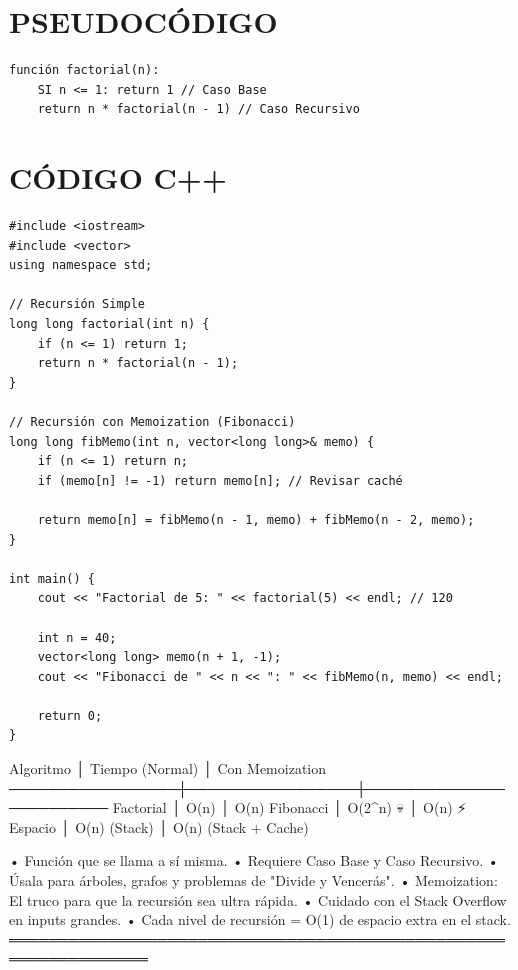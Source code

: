 \section*{PSEUDOCÓDIGO}
\hrulefill
\begin{verbatim}
función factorial(n):
    SI n <= 1: return 1 // Caso Base
    return n * factorial(n - 1) // Caso Recursivo
\end{verbatim}
\section*{CÓDIGO C++}
\hrulefill
\begin{lstlisting}
#include <iostream>
#include <vector>
using namespace std;

// Recursión Simple
long long factorial(int n) {
    if (n <= 1) return 1;
    return n * factorial(n - 1);
}

// Recursión con Memoization (Fibonacci)
long long fibMemo(int n, vector<long long>& memo) {
    if (n <= 1) return n;
    if (memo[n] != -1) return memo[n]; // Revisar caché
    
    return memo[n] = fibMemo(n - 1, memo) + fibMemo(n - 2, memo);
}

int main() {
    cout << "Factorial de 5: " << factorial(5) << endl; // 120
    
    int n = 40;
    vector<long long> memo(n + 1, -1);
    cout << "Fibonacci de " << n << ": " << fibMemo(n, memo) << endl;
    
    return 0;
}
\end{lstlisting}
\begin{dsacomplejidad}
Algoritmo        │ Tiempo (Normal) │ Con Memoization
  ─────────────────┼─────────────────┼────────────────────────
  Factorial        │ O(n)            │ O(n)
  Fibonacci        │ O(2\textasciicircum{}n) 💀       │ O(n) ⚡
  Espacio          │ O(n) (Stack)    │ O(n) (Stack + Cache)
\end{dsacomplejidad}
\begin{dsaentrevistas}

\end{dsaentrevistas}
\begin{dsaresumen}
• Función que se llama a sí misma.
• Requiere Caso Base y Caso Recursivo.
• Úsala para árboles, grafos y problemas de "Divide y Vencerás".
• Memoization: El truco para que la recursión sea ultra rápida.
• Cuidado con el Stack Overflow en inputs grandes.
• Cada nivel de recursión = O(1) de espacio extra en el stack.
════════════════════════════════════════════════════════════════
\end{dsaresumen}

